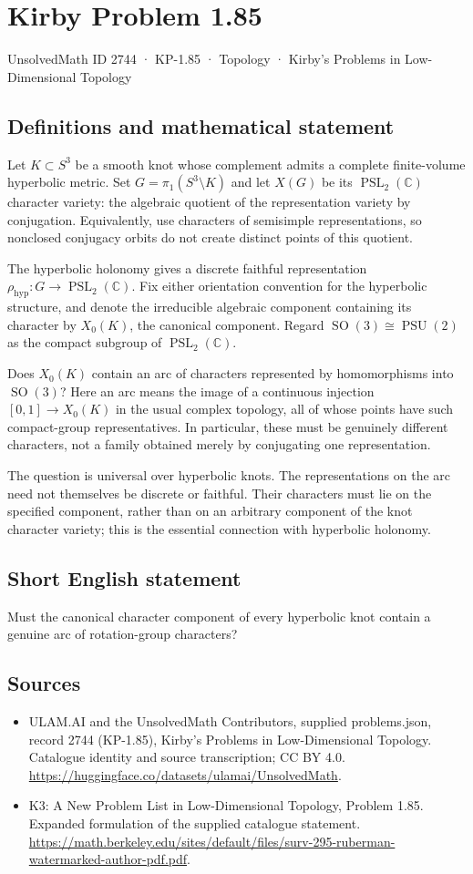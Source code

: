 \documentclass[11pt,a4paper]{article}
\begin{document}
\section*{Kirby Problem 1.85}\label{2744}
{\small UnsolvedMath ID 2744 · KP-1.85 · Topology · Kirby's Problems in Low-Dimensional Topology}
\subsection{Definitions and mathematical statement}
Let $K\subset S^3$ be a smooth knot whose complement admits a complete finite-volume hyperbolic metric. Set $G=\pi_1(S^3\setminus K)$ and let $X(G)$ be its $\operatorname{PSL}_2(\mathbb C)$ character variety: the algebraic quotient of the representation variety by conjugation. Equivalently, use characters of semisimple representations, so nonclosed conjugacy orbits do not create distinct points of this quotient.

The hyperbolic holonomy gives a discrete faithful representation $\rho_{\mathrm{hyp}}:G\to\operatorname{PSL}_2(\mathbb C)$. Fix either orientation convention for the hyperbolic structure, and denote the irreducible algebraic component containing its character by $X_0(K)$, the canonical component. Regard $\operatorname{SO}(3)\cong\operatorname{PSU}(2)$ as the compact subgroup of $\operatorname{PSL}_2(\mathbb C)$.

Does $X_0(K)$ contain an arc of characters represented by homomorphisms into $\operatorname{SO}(3)$? Here an arc means the image of a continuous injection $[0,1]\to X_0(K)$ in the usual complex topology, all of whose points have such compact-group representatives. In particular, these must be genuinely different characters, not a family obtained merely by conjugating one representation.

The question is universal over hyperbolic knots. The representations on the arc need not themselves be discrete or faithful. Their characters must lie on the specified component, rather than on an arbitrary component of the knot character variety; this is the essential connection with hyperbolic holonomy.
\subsection{Short English statement}
Must the canonical character component of every hyperbolic knot contain a genuine arc of rotation-group characters?
\subsection{Sources}
\begin{itemize}
\item[S1] ULAM.AI and the UnsolvedMath Contributors, supplied problems.json, record 2744 (KP-1.85), Kirby's Problems in Low-Dimensional Topology. Catalogue identity and source transcription; CC BY 4.0.
\url{https://huggingface.co/datasets/ulamai/UnsolvedMath}.
\item[S2] K3: A New Problem List in Low-Dimensional Topology, Problem 1.85. Expanded formulation of the supplied catalogue statement.
\url{https://math.berkeley.edu/sites/default/files/surv-295-ruberman-watermarked-author-pdf.pdf}.
\end{itemize}
\end{document}
